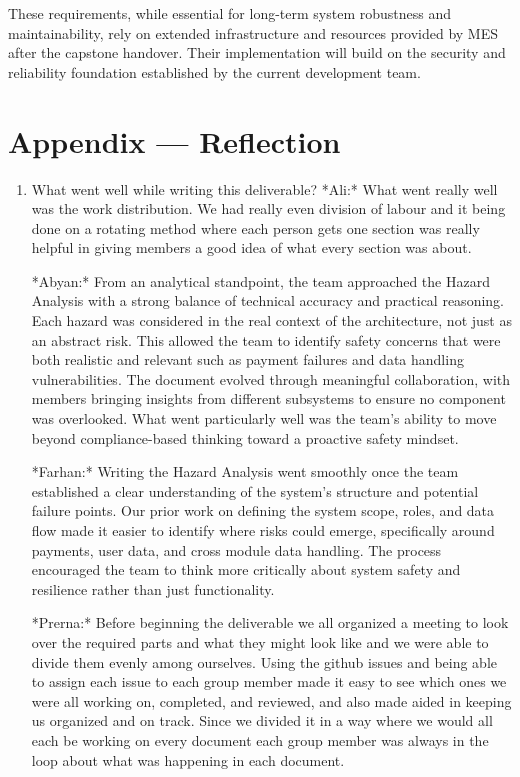 \documentclass{article}
\begin{document}
These requirements, while essential for long-term system robustness and maintainability, rely on extended infrastructure and resources provided by MES after the capstone handover. Their implementation will build on the security and reliability foundation established by the current development team.


\newpage{}

\section*{Appendix --- Reflection}




\begin{enumerate}
    \item What went well while writing this deliverable? 
    *Ali:* What went really well was the work distribution. We had really even division of labour and it being done on a rotating method where each person gets one section was really helpful in giving members a good idea of what every section was about.

    *Abyan:* From an analytical standpoint, the team approached the Hazard Analysis with a strong balance of technical accuracy and practical reasoning. Each hazard was considered in the real context of the architecture, not just as an abstract risk. This allowed the team to identify safety concerns that were both realistic and relevant such as payment failures and data handling vulnerabilities. The document evolved through meaningful collaboration, with members bringing insights from different subsystems to ensure no component was overlooked. What went particularly well was the team’s ability to move beyond compliance-based thinking toward a proactive safety mindset.

    *Farhan:* Writing the Hazard Analysis went smoothly once the team established a clear understanding of the system’s structure and potential failure points. Our prior work on defining the system scope, roles, and data flow made it easier to identify where risks could emerge, specifically around payments, user data, and cross module data handling. The process encouraged the team to think more critically about system safety and resilience rather than just functionality.

    *Prerna:* Before beginning the deliverable we all organized a meeting to look over the required parts and what they might look like and we were able to divide them evenly among ourselves. Using the github issues and being able to assign each issue to each group member made it easy to see which ones we were all working on, completed, and reviewed, and also made aided in keeping us organized and on track. Since we divided it in a way where we would all each be working on every document each group member was always in the loop about what was happening in each document.


\end{enumerate}
\end{document}
